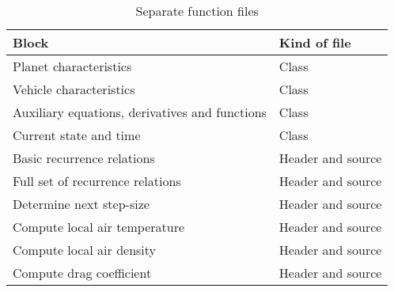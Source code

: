 \begin{table}[!ht]
\begin{center}
\caption{Separate function files}
\label{tab:classes}
\begin{tabular}{|l|l|}
\hline 
\textbf{Block} & \textbf{Kind of file}  \\ \hline 
Planet characteristics & Class \\ \hline
Vehicle characteristics & Class \\ \hline
Auxiliary equations, derivatives and functions & Class \\ \hline
Current state and time & Class \\ \hline
Basic recurrence relations & Header and source \\ \hline
Full set of recurrence relations & Header and source \\ \hline
Determine next step-size & Header and source \\ \hline
Compute local air temperature & Header and source \\ \hline
Compute local air density & Header and source \\ \hline
Compute drag coefficient & Header and source \\ \hline
\end{tabular}
\end{center}
\end{table}



